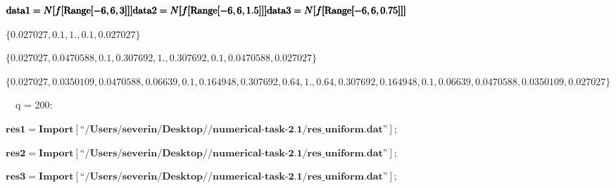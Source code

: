 \documentclass{article}
\newcommand{\unicode}[1]{{}}
\begin{document}
\begin{doublespace}
\noindent\(\pmb{\text{data1} = N[f[\text{Range}[-6, 6,3]]]}\\
\pmb{\text{data2} = N[f[\text{Range}[-6, 6,1.5 ]]]}\\
\pmb{\text{data3} = N[f[\text{Range}[-6, 6,0.75 ]]]}\)
\end{doublespace}

\begin{doublespace}
\noindent\(\{0.027027,0.1,1.,0.1,0.027027\}\)
\end{doublespace}

\begin{doublespace}
\noindent\(\{0.027027,0.0470588,0.1,0.307692,1.,0.307692,0.1,0.0470588,0.027027\}\)
\end{doublespace}

\begin{doublespace}
\noindent\(\{0.027027,0.0350109,0.0470588,0.06639,0.1,0.164948,0.307692,0.64,1.,0.64,0.307692,0.164948,0.1,0.06639,0.0470588,0.0350109,0.027027\}\)
\end{doublespace}

$\unicode{0417}\unicode{0430}\unicode{043f}\unicode{0443}\unicode{0441}\unicode{0442}\unicode{0438}\unicode{043c}$ $\unicode{043f}\unicode{0440}\unicode{043e}\unicode{0433}\unicode{0440}\unicode{0430}\unicode{043c}\unicode{043c}\unicode{0443}$
$\unicode{0434}\unicode{043b}\unicode{044f}$ q = 200:

\begin{doublespace}
\noindent\(\pmb{\text{res1} = \text{Import}[\text{{``}/Users/severin/Desktop/$\unicode{041f}\unicode{0440}\unicode{0430}\unicode{043a}\unicode{0442}\unicode{0438}\unicode{043a}\unicode{0443}\unicode{043c}$/numerical-task-2.1/res$\_$uniform.dat{''}}];}\)
\end{doublespace}

\begin{doublespace}
\noindent\(\pmb{\text{res2} = \text{Import}[\text{{``}/Users/severin/Desktop/$\unicode{041f}\unicode{0440}\unicode{0430}\unicode{043a}\unicode{0442}\unicode{0438}\unicode{043a}\unicode{0443}\unicode{043c}$/numerical-task-2.1/res$\_$uniform.dat{''}}];}\)
\end{doublespace}

\begin{doublespace}
\noindent\(\pmb{\text{res3} = \text{Import}[\text{{``}/Users/severin/Desktop/$\unicode{041f}\unicode{0440}\unicode{0430}\unicode{043a}\unicode{0442}\unicode{0438}\unicode{043a}\unicode{0443}\unicode{043c}$/numerical-task-2.1/res$\_$uniform.dat{''}}];}\)
\end{doublespace}
\end{document}
